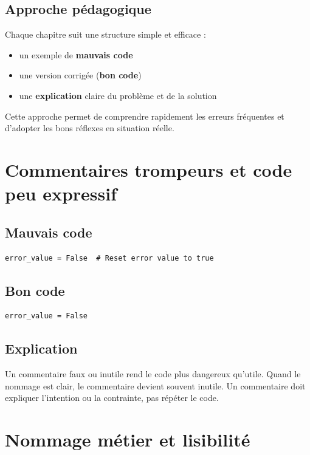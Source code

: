 \documentclass[a4paper,11pt]{report}
\begin{document}
\section{Approche pédagogique}

Chaque chapitre suit une structure simple et efficace :
\begin{itemize}
  \item un exemple de \textbf{mauvais code}
  \item une version corrigée (\textbf{bon code})
  \item une \textbf{explication} claire du problème et de la solution
\end{itemize}

Cette approche permet de comprendre rapidement les erreurs fréquentes et d'adopter les bons réflexes en situation réelle.

\chapter{Commentaires trompeurs et code peu expressif}

\section{Mauvais code}
\begin{lstlisting}
error_value = False  # Reset error value to true
\end{lstlisting}

\section{Bon code}
\begin{lstlisting}
error_value = False
\end{lstlisting}

\section{Explication}
Un commentaire faux ou inutile rend le code plus dangereux qu'utile. Quand le nommage est clair, le commentaire devient souvent inutile. Un commentaire doit expliquer l'intention ou la contrainte, pas répéter le code.

\chapter{Nommage métier et lisibilité}
\end{document}
